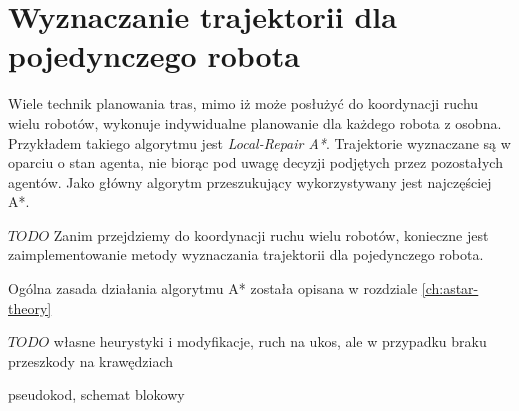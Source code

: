 \section{Wyznaczanie trajektorii dla pojedynczego robota}
\label{ch:alg-single-astar}

Wiele technik planowania tras, mimo iż może posłużyć do koordynacji ruchu wielu robotów, wykonuje indywidualne planowanie dla każdego robota z osobna. Przykładem takiego algorytmu jest {\it Local-Repair A*}. Trajektorie wyznaczane są w oparciu o stan agenta, nie biorąc pod uwagę decyzji podjętych przez pozostałych agentów. Jako główny algorytm przeszukujący wykorzystywany jest najczęściej A*.

$TODO$
Zanim przejdziemy do koordynacji ruchu wielu robotów, konieczne jest zaimplementowanie metody wyznaczania trajektorii dla pojedynczego robota. 

Ogólna zasada działania algorytmu A* została opisana w rozdziale \ref{ch:astar-theory}




$TODO$ własne heurystyki i modyfikacje, ruch na ukos, ale w przypadku braku przeszkody na krawędziach

pseudokod, schemat blokowy